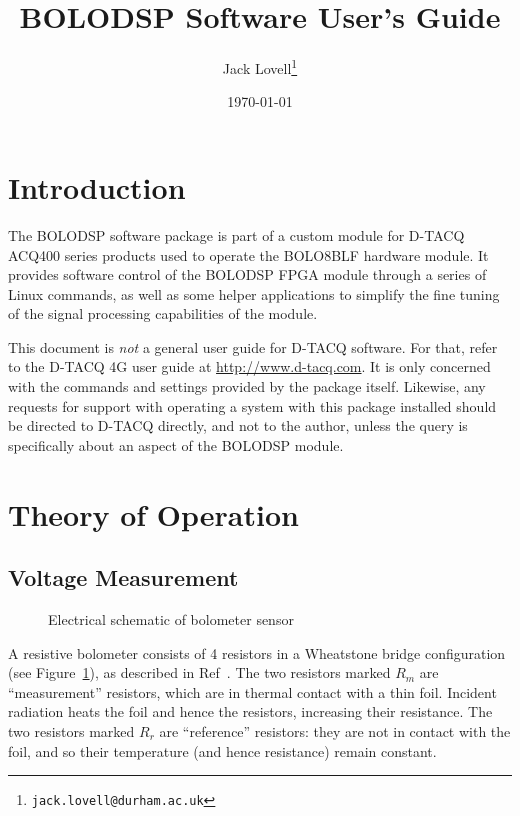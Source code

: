 \documentclass[12pt,a4paper]{article}
\begin{document}
\title{BOLODSP Software User's Guide}

\author{Jack Lovell\thanks{\texttt{jack.lovell@durham.ac.uk}}}

\date{\today}

\maketitle


\tableofcontents

\section{Introduction}
The BOLODSP software package is part of a custom module for D-TACQ ACQ400 series products used to operate the BOLO8BLF hardware module. It provides
software control of the BOLODSP FPGA module through a series of Linux commands, as well as some helper applications to simplify the fine tuning of the
signal processing capabilities of the module.

This document is \textit{not} a general user guide for D-TACQ software. For that, refer to the D-TACQ 4G user guide at \mbox{\url{http://www.d-tacq.com}}.
It is only concerned with the commands and settings provided by the package itself. Likewise, any requests for support with operating a system with this
package installed should be directed to D-TACQ directly, and not to the author, unless the query is specifically about an aspect of the BOLODSP module.

\section{Theory of Operation}
\subsection{Voltage Measurement}%
\label{sec:voltage}
\begin{figure}
  \centering
  \def\svgwidth{0.3\columnwidth}
  
  \caption{Electrical schematic of bolometer sensor\label{fig:sensor}}
\end{figure}
A resistive bolometer consists of 4 resistors in a Wheatstone bridge configuration (see Figure~\ref{fig:sensor}), as described in Ref~\cite{mast-1991}.
The two resistors marked $R_m$ are ``measurement'' resistors, which are in thermal contact with a thin foil. Incident radiation heats the foil and hence
the resistors, increasing their resistance. The two resistors marked $R_r$ are ``reference'' resistors: they are not in contact with the foil, and so their
temperature (and hence resistance) remain constant.
\end{document}
